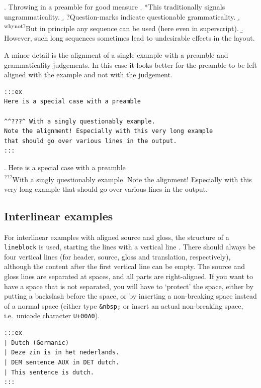 \documentclass[
]{article}
\begin{document}
\ex. \label{ling-ex:4.6} Throwing in a preamble for good measure
  \a. *This traditionally signals ungrammaticality.
  \b. ?Question-marks indicate questionable grammaticality.
  \b. \textsuperscript{whynot?}But in principle any sequence can be used
(here even in superscript).
  \b. However, such long sequences sometimes lead to undesirable effects
in the layout.

A minor detail is the alignment of a single example with a preamble and
grammaticality judgements. In this case it looks better for the preamble
to be left aligned with the example and not with the judgement.

\begin{verbatim}
:::ex
Here is a special case with a preamble

^^???^ With a singly questionably example.
Note the alignment! Especially with this very long example
that should go over various lines in the output.
:::
\end{verbatim}

\ex. \label{ling-ex:4.7} Here is a special case with a preamble\\
  \textsuperscript{???}With a singly questionably example. Note the
alignment! Especially with this very long example that should go over
various lines in the output.

\hypertarget{interlinear-examples}{%
\subsection{Interlinear examples}\label{interlinear-examples}}

For interlinear examples with aligned source and gloss, the structure of
a \texttt{lineblock} is used, starting the lines with a vertical line
\texttt{\textbar{}}. There should always be four vertical lines (for
header, source, gloss and translation, respectively), although the
content after the first vertical line can be empty. The source and gloss
lines are separated at spaces, and all parts are right-aligned. If you
want to have a space that is not separated, you will have to `protect'
the space, either by putting a backslash before the space, or by
inserting a non-breaking space instead of a normal space (either type
\texttt{\&nbsp;} or insert an actual non-breaking space, i.e.~unicode
character \texttt{U+00A0}).

\begin{verbatim}
:::ex
| Dutch (Germanic)
| Deze zin is in het nederlands.
| DEM sentence AUX in DET dutch.
| This sentence is dutch.
:::
\end{verbatim}
\end{document}

